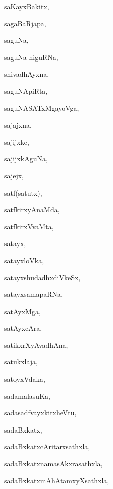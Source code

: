 \begin{multicols}{3}
{\noindent
{saKayxBakitx}, \pageref{saKayxBakitx}

\noindent
{sagaBaRjapa}, \pageref{sagaBaRjapa}

\noindent
{saguNa}, \pageref{saguNa}

\noindent
{saguNa-niguRNa}, \pageref{saguNa-niguRNa}

\noindent
{shivadhAyxna}, \pageref{shivadhAyxna}

\noindent
{saguNApiRta}, \pageref{saguNApiRta}

\noindent
{saguNASATxMgayoVga}, \pageref{saguNASATxMgayoVga}

\noindent
{sajajxna}, \pageref{sajajxna}

\noindent
{sajijxke}, \pageref{sajijxke}

\noindent
{sajijxkAguNa}, \pageref{sajijxkAguNa}

\noindent
{sajejx}, \pageref{sajejx}

\noindent
{satf(satutx)}, \pageref{satfsatutx}

\noindent
{satfkirxyAnaMda}, \pageref{satfkirxyAnaMda}

\noindent
{satfkirxVvaMta}, \pageref{satfkirxVvaMta}

\noindent
{satayx}, \pageref{satayx}

\noindent
{satayxloVka}, \pageref{satayxloVka}

\noindent
{satayxshudadhxdiVkeSx}, \pageref{satayxshudadhxdiVkeSx}

\noindent
{satayxsamapaRNa}, \pageref{satayxsamapaRNa}

\noindent
{satAyxMga}, \pageref{satAyxMga}

\noindent
{satAyxcAra}, \pageref{satAyxcAra}

\noindent
{satikxrXyAvadhAna}, \pageref{satikxrXyAvadhAna}

\noindent
{satukxlaja}, \pageref{satukxlaja}

\noindent
{satoyxVdaka}, \pageref{satoyxVdaka}

\noindent
{sadamalasuKa}, \pageref{sadamalasuKa}

\noindent
{sadasadfvayxkitxheVtu}, \pageref{sadasadfvayxkitxheVtu}

\noindent
{sadaBxkatx}, \pageref{sadaBxkatx}

\noindent
{sadaBxkatxcAritarxsathxla}, \pageref{sadaBxkatxcAritarxsathxla}

\noindent
{sadaBxkatxnamasAkxrasathxla}, \pageref{sadaBxkatxnamasAkxrasathxla}

\noindent
{sadaBxkatxmAhAtamxyXsathxla}, \pageref{sadaBxkatxmAhAtamxyXsathxla}

}
\end{multicols}
